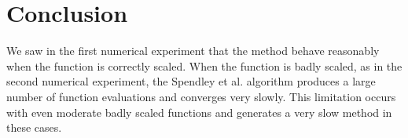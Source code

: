 \section{Conclusion}

We saw in the first numerical experiment that the method 
behave reasonably when the function is correctly scaled.
When the function is badly scaled, as in the second numerical 
experiment, the Spendley et al. algorithm produces a large 
number of function evaluations and converges very slowly.
This limitation occurs with even moderate badly scaled 
functions and generates a very slow method in these 
cases.


